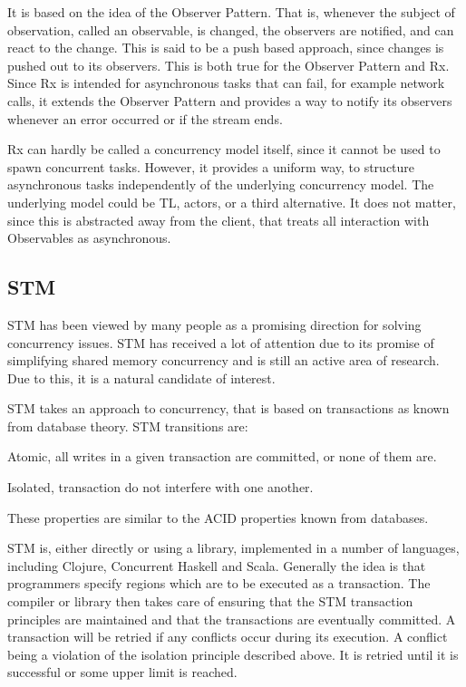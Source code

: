 It is based on the idea of the Observer Pattern\cite{gamma1994design}. That is, whenever the subject of observation, called an observable, is changed, the observers are notified, and can react to the change. This is said to be a push based approach, since changes is pushed out to its observers. This is both true for the Observer Pattern and \ac{Rx}. Since \ac{Rx} is intended for asynchronous tasks that can fail, for example network calls, it extends the Observer Pattern and provides a way to notify its observers whenever an error occurred or if the stream ends.

\ac{Rx} can hardly be called a concurrency model itself, since it cannot be used to spawn concurrent tasks. However, it provides a uniform way, to structure asynchronous tasks independently of the underlying concurrency model. The underlying model could be \ac{TL}, actors, or a third alternative. It does not matter, since this is abstracted away from the client, that treats all interaction with Observables as asynchronous.

\subsection{\acl{STM}}
\label{sec:prelim_stm}
\ac{STM} has been viewed by many people as a promising direction for solving concurrency issues\cite{sutter2005software}. \ac{STM} has received a lot of attention due to its promise of simplifying shared memory concurrency and is still an active area of research. Due to this, it is a natural candidate of interest.

\ac{STM} takes an approach to concurrency, that is based on transactions as known from database theory\cite[p. 1]{shavit1997software}. \ac{STM} transitions are:
\begin{inparaenum}[(1)]
\item Atomic, all writes in a given transaction are committed, or none of them are.
\item Isolated, transaction do not interfere with one another\cite{herlihy2011tm}.
\end{inparaenum} 
These properties are similar to the \ac{ACID} properties known from databases\cite[p. 754]{elmasri2011fundamentals}.

\ac{STM} is, either directly or using a library, implemented in a number of languages, including Clojure\cite[p. 101]{sevenModels}, Concurrent Haskell\cite{harris2005composable} and Scala\cite{goodman2011muts}. Generally the idea is that programmers specify regions which are to be executed as a transaction. The compiler or library then takes care of ensuring that the \ac{STM} transaction principles are maintained and that the transactions are eventually committed\cite[p. 1]{saha2006mcrt}. A transaction will be retried if any conflicts occur during its execution. A conflict being a violation of the isolation principle described above. It is retried until it is successful or some upper limit is reached.

